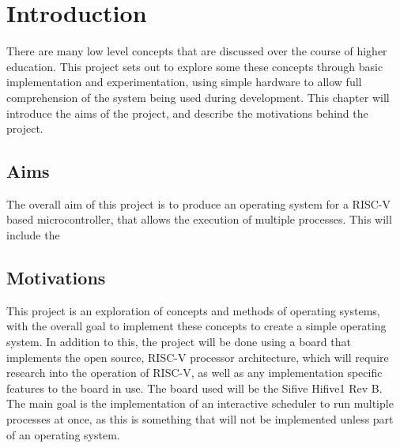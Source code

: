 \chapter{Introduction}
\label{cha:intro}
There are many low level concepts that are discussed over the course of higher education. This project sets out to explore some these concepts through basic implementation and experimentation, using simple hardware to allow full comprehension of the system being used during development. This chapter will introduce the aims of the project, and describe the motivations behind the project.
\section{Aims}
The overall aim of this project is to produce an operating system for a RISC-V based microcontroller, that allows the execution of multiple processes. This will include the 
\section{Motivations}
This project is an exploration of concepts and methods of operating systems, with the overall goal to implement these concepts to create a simple operating system. 
In addition to this, the project will be done using a board that implements the open source, RISC-V processor architecture, which will require research into the operation of RISC-V, as well as any implementation specific features to the board in use. The board used will be the Sifive Hifive1 Rev B.
The main goal is the implementation of an interactive scheduler to run multiple processes at once, as this is something that will not be implemented unless part of an operating system.

